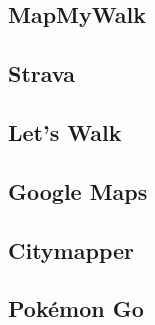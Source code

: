 
\subsection{MapMyWalk}

\subsection{Strava}

\subsection{Let's Walk}

\subsection{Google Maps}

\subsection{Citymapper}

\subsection{Pok\'{e}mon Go}






%
%
%
%
